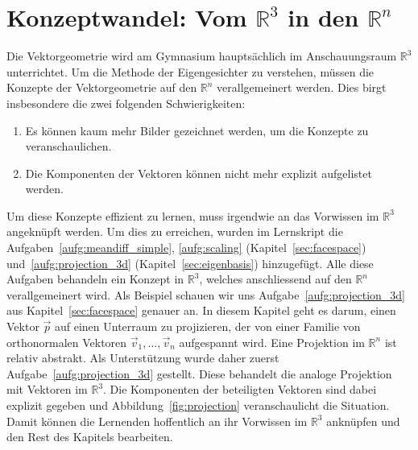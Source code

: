 \section{Konzeptwandel: Vom $\mathbb R^3$ in den $\mathbb R^n$}
Die Vektorgeometrie wird am Gymnasium hauptsächlich im Anschauungsraum $\mathbb R^3$ unterrichtet.
Um die Methode der Eigengesichter zu verstehen, müssen die Konzepte der Vektorgeometrie auf den $\mathbb R^n$ verallgemeinert werden.
Dies birgt insbesondere die zwei folgenden Schwierigkeiten:
\begin{enumerate}[label=\arabic*.]
	\item Es können kaum mehr Bilder gezeichnet werden, um die Konzepte zu veranschaulichen.
	\item Die Komponenten der Vektoren können nicht mehr explizit aufgelistet werden.
\end{enumerate}
Um diese Konzepte effizient zu lernen, muss irgendwie an das Vorwissen im $\mathbb R^3$ angeknüpft werden.
Um dies zu erreichen, wurden im Lernskript die Aufgaben~\ref{aufg:meandiff_simple}, \ref{aufg:scaling} (Kapitel~\ref{sec:facespace}) und~\ref{aufg:projection_3d} (Kapitel~\ref{sec:eigenbasis}) hinzugefügt.
Alle diese Aufgaben behandeln ein Konzept in $\mathbb R^3$, welches anschliessend auf den $\mathbb R^n$ verallgemeinert wird.
Als Beispiel schauen wir uns Aufgabe~\ref{aufg:projection_3d} aus Kapitel~\ref{sec:facespace} genauer an.
In diesem Kapitel geht es darum, einen Vektor $\vec{p}$ auf einen Unterraum zu projizieren, der von einer Familie von orthonormalen Vektoren $\vec{v}_1,\ldots,\vec{v}_n$ aufgespannt wird.
Eine Projektion im $\mathbb R^n$ ist relativ abstrakt.
Als Unterstützung wurde daher zuerst Aufgabe~\ref{aufg:projection_3d} gestellt.
Diese behandelt die analoge Projektion mit Vektoren im $\mathbb R^3$.
Die Komponenten der beteiligten Vektoren sind dabei explizit gegeben und Abbildung~\ref{fig:projection} veranschaulicht die Situation.
Damit können die Lernenden hoffentlich an ihr Vorwissen im $\mathbb R^3$ anknüpfen und den Rest des Kapitels bearbeiten.